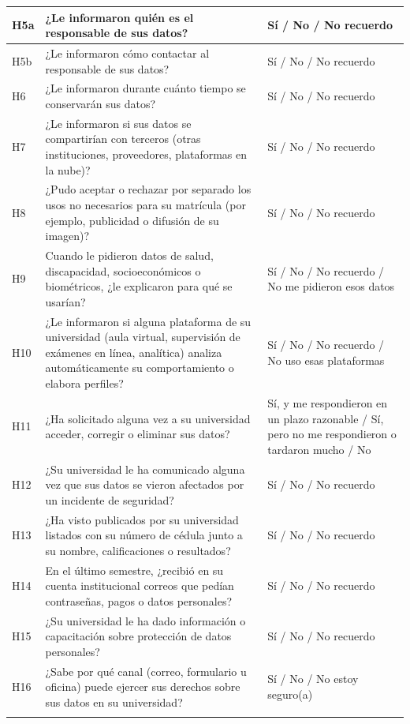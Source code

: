 {\begin{xltabular}{\textwidth}{|>{\raggedright\arraybackslash}p{1.1cm}|>{\raggedright\arraybackslash}X|>{\raggedright\arraybackslash}p{4.6cm}|}
  H5a & ¿Le informaron quién es el responsable de sus datos? & Sí / No / No recuerdo \\ \hline
  H5b & ¿Le informaron cómo contactar al responsable de sus datos? & Sí / No / No recuerdo \\ \hline
  H6 & ¿Le informaron durante cuánto tiempo se conservarán sus datos? & Sí / No / No recuerdo \\ \hline
  H7 & ¿Le informaron si sus datos se compartirían con terceros (otras instituciones, proveedores, plataformas en la nube)? & Sí / No / No recuerdo \\ \hline
  H8 & ¿Pudo aceptar o rechazar por separado los usos no necesarios para su matrícula (por ejemplo, publicidad o difusión de su imagen)? & Sí / No / No recuerdo \\ \hline
  H9 & Cuando le pidieron datos de salud, discapacidad, socioeconómicos o biométricos, ¿le explicaron para qué se usarían? & Sí / No / No recuerdo / No me pidieron esos datos \\ \hline
  H10 & ¿Le informaron si alguna plataforma de su universidad (aula virtual, supervisión de exámenes en línea, analítica) analiza automáticamente su comportamiento o elabora perfiles? & Sí / No / No recuerdo / No uso esas plataformas \\ \hline
  H11 & ¿Ha solicitado alguna vez a su universidad acceder, corregir o eliminar sus datos? & Sí, y me respondieron en un plazo razonable / Sí, pero no me respondieron o tardaron mucho / No \\ \hline
  H12 & ¿Su universidad le ha comunicado alguna vez que sus datos se vieron afectados por un incidente de seguridad? & Sí / No / No recuerdo \\ \hline
  H13 & ¿Ha visto publicados por su universidad listados con su número de cédula junto a su nombre, calificaciones o resultados? & Sí / No / No recuerdo \\ \hline
  H14 & En el último semestre, ¿recibió en su cuenta institucional correos que pedían contraseñas, pagos o datos personales? & Sí / No / No recuerdo \\ \hline
  H15 & ¿Su universidad le ha dado información o capacitación sobre protección de datos personales? & Sí / No / No recuerdo \\ \hline
  H16 & ¿Sabe por qué canal (correo, formulario u oficina) puede ejercer sus derechos sobre sus datos en su universidad? & Sí / No / No estoy seguro(a) \\ \hline
   \\ \hline

\end{xltabular}}
